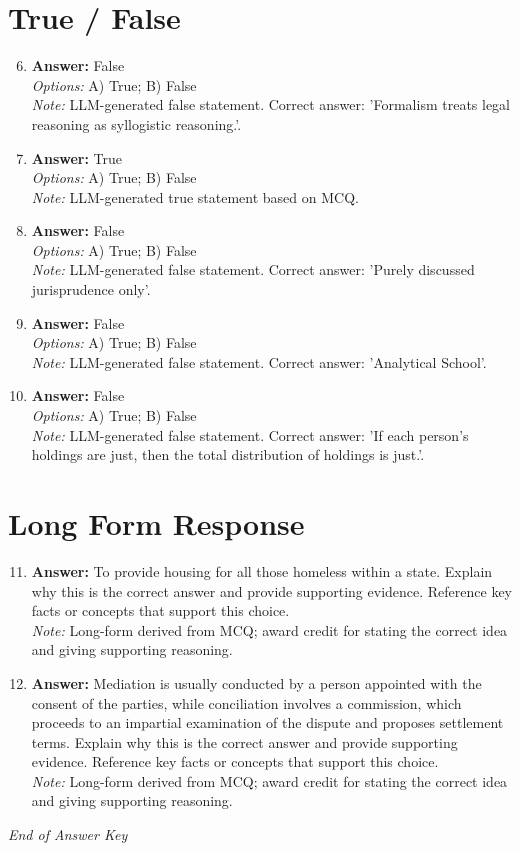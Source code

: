 \documentclass[12pt]{article}
\begin{document}
\section*{True / False}
\begin{enumerate}[label=\arabic*.]
\setcounter{enumi}{5}
\item \textbf{Answer:} False
\\ \textit{Options:} A) True; B) False
\\ \textit{Note:} LLM-generated false statement. Correct answer: 'Formalism treats legal reasoning as syllogistic reasoning.'.
\item \textbf{Answer:} True
\\ \textit{Options:} A) True; B) False
\\ \textit{Note:} LLM-generated true statement based on MCQ.
\item \textbf{Answer:} False
\\ \textit{Options:} A) True; B) False
\\ \textit{Note:} LLM-generated false statement. Correct answer: 'Purely discussed jurisprudence only'.
\item \textbf{Answer:} False
\\ \textit{Options:} A) True; B) False
\\ \textit{Note:} LLM-generated false statement. Correct answer: 'Analytical School'.
\item \textbf{Answer:} False
\\ \textit{Options:} A) True; B) False
\\ \textit{Note:} LLM-generated false statement. Correct answer: 'If each person's holdings are just, then the total distribution of holdings is just.'.
\end{enumerate}

\section*{Long Form Response}
\begin{enumerate}[label=\arabic*.]
\setcounter{enumi}{10}
\item \textbf{Answer:} To provide housing for all those homeless within a state. Explain why this is the correct answer and provide supporting evidence. Reference key facts or concepts that support this choice.
\\ \textit{Note:} Long-form derived from MCQ; award credit for stating the correct idea and giving supporting reasoning.
\item \textbf{Answer:} Mediation is usually conducted by a person appointed with the consent of the parties, while conciliation involves a commission, which proceeds to an impartial examination of the dispute and proposes settlement terms. Explain why this is the correct answer and provide supporting evidence. Reference key facts or concepts that support this choice.
\\ \textit{Note:} Long-form derived from MCQ; award credit for stating the correct idea and giving supporting reasoning.
\end{enumerate}

\vfill
\noindent\textit{End of Answer Key}
\end{document}
